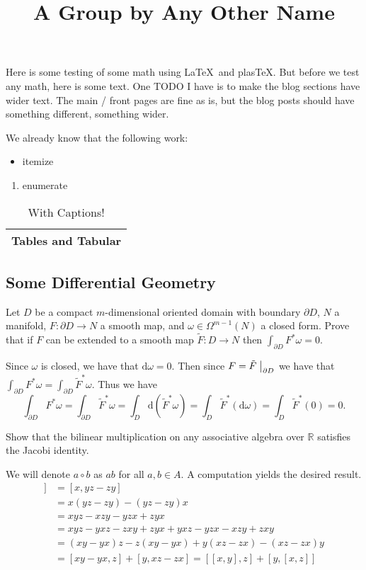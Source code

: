 \documentclass{article}
\title{A Group by Any \newline Other Name}
\begin{document}
\maketitle


Here is some testing of some math using \LaTeX\ and plas\TeX.
But before we test any math, here is some text.
One TODO I have is to make the blog sections have wider text.
The main / front pages are fine as is, but the blog posts should have something different, something wider.

We already know that the following work:
\begin{itemize}
\item itemize
\end{itemize}

\begin{enumerate}
\item enumerate
\end{enumerate}

\begin{table}
  \centering
  \begin{tabular}{|c|}
    \hline
    Tables and Tabular \\
    \hline
  \end{tabular}
  \caption{With Captions!}
\end{table}

\subsection*{Some Differential Geometry}

Let $D$ be a compact $m$-dimensional oriented domain with boundary $\partial D$, $N$ a manifold, $F\colon \partial D \to N$ a smooth map, and $\omega \in \Omega^{m - 1}(N)$ a closed form.
Prove that if $F$ can be extended to a smooth map $\tilde{F}\colon D \to N$ then $\int_{\partial D} F^{*}\omega = 0$.

Since $\omega$ is closed, we have that $\text{d} \omega = 0$.
Then since $F = \tilde{F}\bigm|_{\partial D}$ we have that $\int_{\partial D} F^{*}\omega = \int_{\partial D} \tilde{F}^{*}\omega$.
Thus we have
\[
  \int_{\partial D} F^{*}\omega = \int_{\partial D} \tilde{F}^{*}\omega = \int_{D} \text{d} \left(\tilde{F}^{*}\omega\right) = \int_{D} \tilde{F}^{*}(\text{d} \omega) = \int_{D} \tilde{F}^{*}(0) = 0.
\]

Show that the bilinear multiplication on any associative algebra over $\mathbb{R}$ satisfies the Jacobi identity.

We will denote $a \circ b$ as $ab$ for all $a, b \in A$.
A computation yields the desired result.
\begin{align*}
  [x, [y, z]] &= [x, yz - zy] \\
              &= x(yz - zy) - (yz - zy)x \\
              &= xyz - xzy - yzx + zyx \\
              &= xyz - yxz - zxy + zyx + yxz - yzx - xzy + zxy \\
              &= (xy - yx)z - z(xy - yx) + y(xz - zx) - (xz - zx)y \\
              &= [xy - yx, z] + [y, xz - zx] = [[x, y], z] + [y, [x, z]]
\end{align*}
\end{document}
